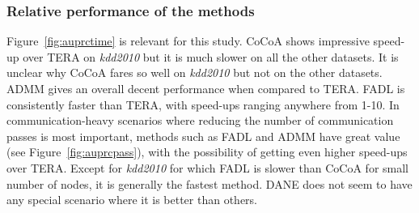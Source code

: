 \documentclass[twoside, 11pt]{article}
\begin{document}
\subsubsection{Relative performance of the methods}
\label{subsubsec:relative}

Figure~\ref{fig:auprctime} is relevant for this study.
CoCoA shows impressive speed-up over TERA on {\it kdd2010} but it is much slower on all the other datasets. It is unclear why CoCoA fares so well on {\it kdd2010} but not on the other datasets. ADMM gives an overall decent performance when compared to TERA. FADL is consistently faster than TERA, with speed-ups ranging anywhere from 1-10. In communication-heavy scenarios where reducing the number of communication passes is most important, methods such as FADL and ADMM have great value (see Figure~\ref{fig:auprcpass}), with the possibility of getting even higher speed-ups over TERA. Except for {\it kdd2010} for which FADL is slower than CoCoA for small number of nodes, it is generally the fastest method. DANE does not seem to have any special scenario where it is better than others.
\end{document}
